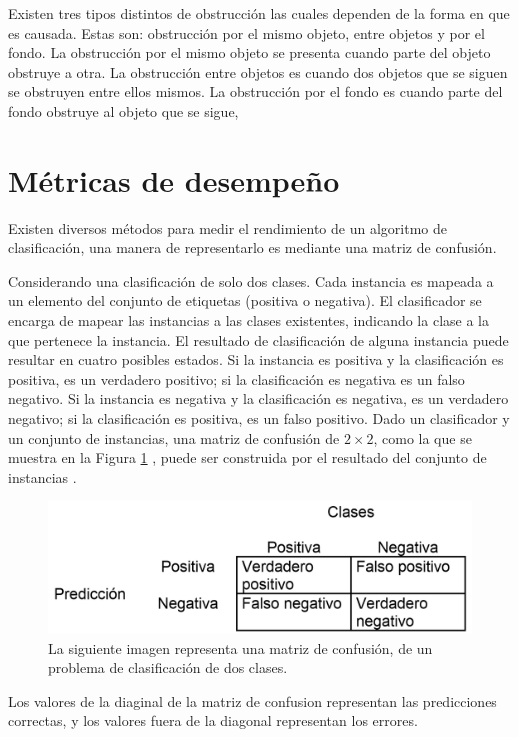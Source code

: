 Existen tres tipos distintos de obstrucción las cuales dependen de la forma en que es causada. Estas son: obstrucción por el mismo objeto, entre objetos y por el fondo. La obstrucción por el mismo objeto se presenta cuando parte del objeto obstruye a otra. La obstrucción entre objetos es cuando dos objetos que se siguen se obstruyen entre ellos mismos. La obstrucción por el fondo es cuando parte del fondo obstruye al objeto que se sigue, \citep{YilmazA.JavedO.andShah2006}




\section{Métricas de desempeño}\label{Metricas}

Existen diversos métodos para medir el rendimiento de un algoritmo de clasificación, una manera de representarlo es mediante una matriz de confusión. 

Considerando una clasificación de solo dos clases. Cada instancia es mapeada a un elemento del conjunto de etiquetas (positiva o negativa). El clasificador se encarga de mapear las instancias a las clases existentes, indicando la clase a la que pertenece la instancia.
El resultado de clasificación de alguna instancia puede resultar en cuatro posibles estados. Si la instancia es positiva y la clasificación es positiva, es un verdadero positivo; si la clasificación es negativa es un falso negativo. Si la instancia es negativa y la clasificación es negativa, es un verdadero negativo; si la clasificación es positiva, es un falso positivo.  
Dado un clasificador y un conjunto de instancias, una matriz de confusión de $2 \times 2$, como la que se muestra en la Figura \ref{fig:Matrix} , puede ser construida por el resultado del conjunto de instancias \citep{Fawcett2006}.   
\begin{figure}[h!]
\begin{center}
\includegraphics[scale=.4]{./Figures/MatrixConfusion.png}
\end{center}
\caption{La siguiente imagen representa una matriz de confusión, de un problema de clasificación de dos clases.}
\label{fig:Matrix}
\end{figure}
Los valores de la diaginal de la matriz de confusion representan las predicciones correctas, y los valores fuera de la diagonal representan los errores.

